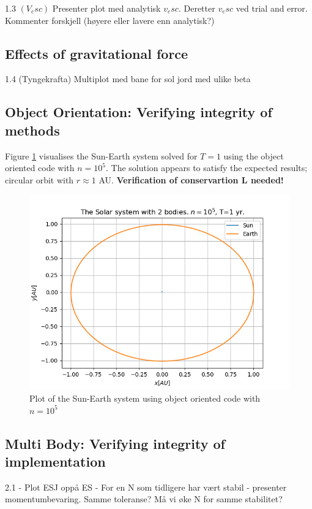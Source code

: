 \documentclass[%
oneside,                 %
final,                   %
10pt]{article}
\begin{document}
1.3 $(V_esc)$ Presenter plot med analytisk $v_esc.$ Deretter $v_esc$ ved trial and error. Kommenter forskjell (høyere eller lavere enn analytisk?)
\subsection{Effects of gravitational force}
1.4 (Tyngekrafta)  Multiplot med bane for sol jord med ulike beta


\subsection{Object Orientation: Verifying integrity of methods} 
Figure \ref{fig:twobodyplotOO} visualises the Sun-Earth system solved for $T=1$ using the object oriented code with $n=10^5$. The solution appears to satisfy the expected results; circular orbit with $r\approx 1$ AU. \textbf{Verification of conservartion L needed!}

\begin{figure}[!htb]
        \centering 
         \includegraphics[scale=.6]{../Results/SunEarthOONj5T1png} 
        \caption{Plot of the Sun-Earth system using object oriented code  with $n=10^5$}
        \label{fig:twobodyplotOO}   
\end{figure}  

\subsection{Multi Body: Verifying integrity of implementation }

2.1 - Plot ESJ oppå ES
    - For en N som tidligere har vært stabil - presenter momentumbevaring. Samme toleranse? Må vi øke N for samme stabilitet?
\end{document}
